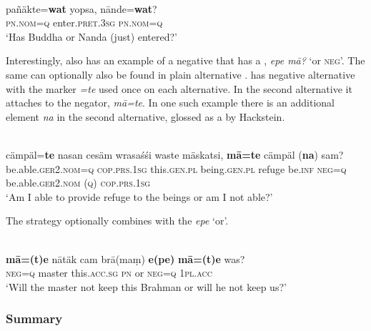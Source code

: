 \ea%
    \label{ex:indo:38}
    \\
    \gll pañäkte=\textbf{{wat}} yopsa, n\=ande{=}\textbf{{wat}}?\\
    \textsc{pn.}\textsc{nom=q}  enter.\textsc{pret}.3\textsc{sg}   \textsc{pn.}\textsc{nom=q}\\
    \glt ‘Has Buddha or Nanda (just) entered?’ \citep[110]{Hackstein2013}
    \z

Interestingly, \citet[111]{Hackstein2013} also has an example of a negative  that has a ,  \textit{epe m\=a?} ‘or \textsc{neg}’. The same  can optionally also be found in plain alternative  \citep[111]{Hackstein2013}.  has negative alternative  with the marker \textit{=te} used once on each alternative. In the second alternative it attaches to the negator, \textit{m\=a=te}. In one such example there is an additional element \textit{na} in the second alternative, glossed as a  by Hackstein.

\ea%
    \label{ex:indo:39}
    \\
    \gll cämpäl=\textbf{{te}} nasan    cesäm    wrasaśśi  waste mäskatsi, \textbf{{m\=a=te}} cämpäl      (\textbf{{na}})  sam?\\
    be.able.\textsc{ger}2.\textsc{nom}=\textsc{q}  \textsc{cop.prs}.1\textsc{sg}  this.\textsc{gen.pl}  being.\textsc{gen.pl}  refuge be.\textsc{inf}    \textsc{neg=q}  be.able.\textsc{ger}2.\textsc{nom}  (\textsc{q})  \textsc{cop.prs.1sg}\\
    \glt ‘Am I able to provide refuge to the beings or am I not able?’ \citep[113]{Hackstein2013}
    \z

\noindent The  strategy optionally combines with the  \textit{epe} ‘or’.

\ea%
    \label{ex:indo:40}
    \\
    \gll \textbf{{m\=a=(t)e}} n\=atäk  cam    br\=a(maṃ) \textbf{{e(pe)}} \textbf{m\=a=(t)e} was?\\
    \textsc{neg=q}    master  this.\textsc{acc.sg}  \textsc{pn}    or  \textsc{neg=q} 1\textsc{pl.acc}\\
    \glt ‘Will the master not keep this Brahman or will he not keep us?’ \citep[113]{Hackstein2013}
    \z


\subsubsection{Summary}\label{sec:5.5.2.6}

